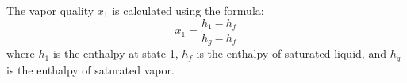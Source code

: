 The vapor quality \( x_1 \) is calculated using the formula:  
\[
x_1 = \frac{h_1 - h_f}{h_g - h_f}
\]  
where \( h_1 \) is the enthalpy at state 1, \( h_f \) is the enthalpy of saturated liquid, and \( h_g \) is the enthalpy of saturated vapor.